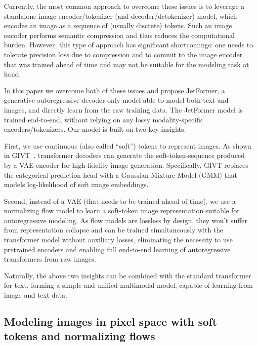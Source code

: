 \documentclass{article} %
\newcommand{\name}{JetFormer\xspace}
\begin{document}
Currently, the most common approach to overcome these issues is to leverage a standalone image encoder/tokenizer (and decoder/detokenizer) model, which encodes an image as a sequence of (usually discrete) tokens. Such an image encoder performs semantic compression and thus reduces the computational burden. However, this type of approach has significant shortcomings: one needs to tolerate precision loss due to compression and to commit to the image encoder that was trained ahead of time and may not be suitable for the modeling task at hand.

In this paper we overcome both of these issues and propose \name, a generative autoregressive decoder-only model able to model both text and images, and directly learn from the raw training data. The \name model is trained end-to-end, without relying on any lossy modality-specific encoders/tokenizers. Our model is built on two key insights.

First, we use continuous (also called ``soft'') tokens to represent images. As shown in GIVT~\citep{tschannen2023givt}, transformer decoders can generate the soft-token-sequence produced by a VAE encoder for high-fidelity image generation. Specifically, GIVT replaces the categorical prediction head with a Gaussian Mixture Model (GMM) that models log-likelihood of soft image embeddings.

Second, instead of a VAE (that needs to be trained ahead of time), we use a normalizing flow model to learn a soft-token image representation suitable for autoregressive modeling. As flow models are lossless by design, they won't suffer from representation collapse and can be trained simultaneously with the transformer model without auxiliary losses, eliminating the necessity to use pretrained encoders and enabling full end-to-end learning of autoregressive transformers from raw images.

Naturally, the above two insights can be combined with the standard transformer for text, forming a simple and unified multimodal model, capable of learning from image and text data.

\vspace{-1mm}

\subsection{Modeling images in pixel space with soft tokens and normalizing flows} \label{sec:image_gen}
\end{document}
